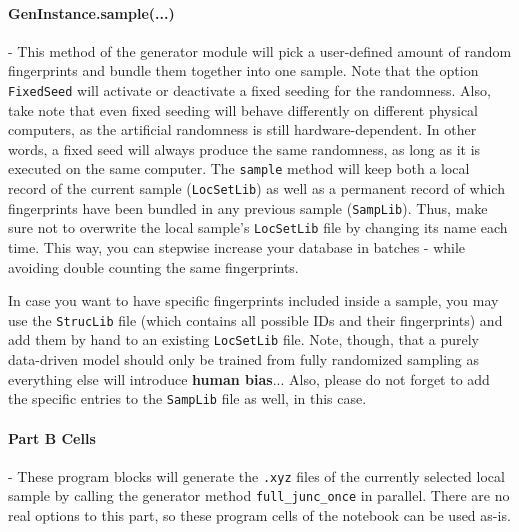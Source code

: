 \documentclass[12pt]{achemso}
\begin{document}
\paragraph{GenInstance.sample(...)} - This method of the generator module will pick a user-defined amount of random fingerprints and bundle them together into one sample. Note that the option \texttt{FixedSeed} will activate or deactivate a fixed seeding for the randomness. Also, take note that even fixed seeding will behave differently on different physical computers, as the artificial randomness is still hardware-dependent. In other words, a fixed seed will always produce the same randomness, as long as it is executed on the same computer. The \texttt{sample} method will keep both a local record of the current sample (\texttt{LocSetLib}) as well as a permanent record of which fingerprints have been bundled in any previous sample (\texttt{SampLib}). Thus, make sure not to overwrite the local sample's \texttt{LocSetLib} file by changing its name each time. This way, you can stepwise increase your database in batches - while avoiding double counting the same fingerprints.

\noindent In case you want to have specific fingerprints included inside a sample, you may use the \texttt{StrucLib} file (which contains all possible IDs and their fingerprints) and add them by hand to an existing \texttt{LocSetLib} file. Note, though, that a purely data-driven model should only be trained from fully randomized sampling as everything else will introduce \textbf{human bias}... Also, please do not forget to add the specific entries to the \texttt{SampLib} file as well, in this case.

\paragraph{Part B Cells} - These program blocks will generate the \texttt{.xyz} files of the currently selected local sample by calling the generator method \texttt{full\_junc\_once} in parallel. There are no real options to this part, so these program cells of the notebook can be used as-is.
\end{document}
